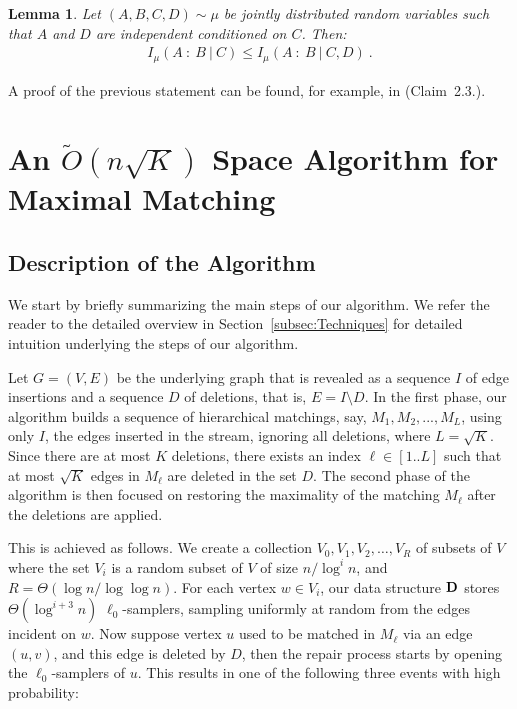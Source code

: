 \documentclass[11pt,a4paper]{article}
\newtheorem{lemma}{Lemma}
\newcommand{\D}{\mathsf{\bf D}}
\begin{document}
\begin{lemma} \label{lem:property-mi}
    Let $(A,B,C,D) \sim \mu$ be jointly distributed random variables such that $A$ and $D$ are independent conditioned on $C$. Then:
    \begin{align*}
        I_{\mu}(A \ : \ B \ | \ C) \le I_{\mu}(A \ : \ B \ | \ C, D) \ . 
    \end{align*}
\end{lemma}
A proof of the previous statement can be found, for example, in \cite{akl16} (Claim~2.3.).

\section{An $\tilde{O}(n \sqrt{K})$ Space Algorithm for \textsf{Maximal Matching}} \label{sec:alg}


\subsection{Description of the Algorithm}

We start by briefly summarizing the main steps of our algorithm. We refer the reader to the detailed overview in Section~\ref{subsec:Techniques} for detailed intuition underlying the steps of our algorithm.

Let $G=(V,E)$ be the underlying graph that is revealed as a sequence $I$ of edge insertions and a sequence $D$ of deletions, that is, $E = I \setminus D$. 
In the first phase, our algorithm  builds a sequence of hierarchical matchings, say, $M_1, M_2, ..., M_{L}$, using only $I$, the edges inserted in the stream, ignoring all deletions, where $L = \sqrt{K}$. 
Since there are at most $K$ deletions, there exists an index $\ell \in [1..L]$ such that at most $\sqrt{K}$ edges in $M_{\ell}$ are deleted in the set $D$. The second phase of the algorithm is then focused on restoring the maximality of the matching $M_{\ell}$ after the deletions are applied. 

This is achieved as follows. We create a collection $V_0, V_1, V_2, \dots, V_R$ of subsets of $V$ where the set $V_i$ is a random subset of $V$ of size $n/\log^i n$, and $R = \Theta(\log n / \log \log n)$. For each vertex $w \in V_i$, our data structure $\D$ stores $\Theta(\log^{i+3} n)$ $\ell_0$-samplers, sampling uniformly at random from the edges incident on $w$. Now suppose vertex $u$ used to be matched in $M_{\ell}$ via an edge $(u,v)$, and this edge is deleted by $D$, then the repair process starts by opening the $\ell_0$-samplers of $u$. This results in one of the following three events with high probability: 
\end{document}
